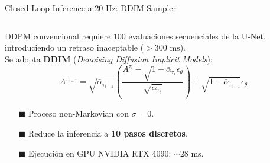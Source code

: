 
\begin{frame}{Closed-Loop Inference a 20 Hz: DDIM Sampler}
  \vspace{0.8mm}
  \begin{columns}[T, onlytextwidth]
    \begin{column}{0.485\textwidth}
      \begin{tcolorbox}[
        enhanced,
        colback=WhiteBg,
        colframe=UCNBlue,
        arc=\CardArc,
        boxrule=\CardRule,
        height=\CardHeightDouble,
        title={\CardTitleFont Deterministic DDIM Sampling \cite{song2021ddim}},
        colbacktitle=UCNBlue,
        coltitle=WhiteBg,
        top=1.2mm, bottom=1.2mm, left=1.8mm, right=1.8mm
      ]
        {\BodyFont
        DDPM convencional requiere $100$ evaluaciones secuenciales de la U-Net, introduciendo un retraso inaceptable ($>300\text{ ms}$).\\
        Se adopta \textbf{DDIM} (\textit{Denoising Diffusion Implicit Models}):
        \begin{equation*}
          A^{\tau_{i-1}} = \sqrt{\bar{\alpha}_{\tau_{i-1}}} \left( \frac{A^{\tau_i} - \sqrt{1 - \bar{\alpha}_{\tau_i}}\epsilon_\theta}{\sqrt{\bar{\alpha}_{\tau_i}}} \right) + \sqrt{1 - \bar{\alpha}_{\tau_{i-1}}} \epsilon_\theta
        \end{equation*}
        \vspace{0.3mm}
        \begin{itemize}\setlength{\itemsep}{1.2pt}
          \item[\textcolor{UCNBlue}{$\blacksquare$}] Proceso non-Markovian con $\sigma = 0$.
          \item[\textcolor{UCNBlue}{$\blacksquare$}] Reduce la inferencia a \textbf{10 pasos discretos}.
          \item[\textcolor{UCNBlue}{$\blacksquare$}] Ejecución en GPU NVIDIA RTX 4090: $\sim 28\text{ ms}$.
        \end{itemize}}
      \end{tcolorbox}
    \end{column}


\end{columns}
\end{frame}
